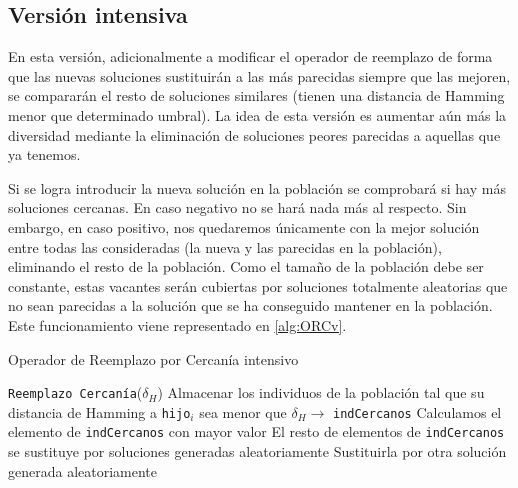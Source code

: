 \subsection{Versión intensiva}

En esta versión, adicionalmente a modificar el operador de reemplazo de forma que las nuevas soluciones sustituirán a las más parecidas siempre que las mejoren, se compararán el resto de soluciones similares (tienen una distancia de Hamming menor que determinado umbral). 
La idea de esta versión es aumentar aún más la diversidad mediante la eliminación de soluciones peores parecidas a aquellas que ya tenemos. 

Si se logra introducir la nueva solución en la población se comprobará si hay más soluciones cercanas. 
En caso negativo no se hará nada más al respecto. 
Sin embargo, en caso positivo, nos quedaremos únicamente con la mejor solución entre todas las consideradas (la nueva y las parecidas en la población), eliminando el resto de la población. 
Como el tamaño de la población debe ser constante, estas vacantes serán cubiertas por soluciones totalmente aleatorias que no sean parecidas a la solución que se ha conseguido mantener en la población. 
Este funcionamiento viene representado en \ref{alg:ORCv}.

\begin{algorithm}[H]
\caption{Operador de Reemplazo por Cercanía intensivo}\label{alg:ORCv}
\begin{algorithmic}[1]
\Procedure \texttt{Reemplazo Cercanía}($\delta_H$)
	\State Almacenar los individuos de la población tal que su distancia de Hamming a \texttt{hijo$_i$} sea menor que $\delta_H \xrightarrow{}{} $ \texttt{indCercanos}
	\State Calculamos el elemento de \texttt{indCercanos} con mayor valor
	\State El resto de elementos de \texttt{indCercanos} se sustituye por soluciones generadas aleatoriamente
		\State Sustituirla por otra solución generada aleatoriamente
	\EndWhile
\EndFor
\EndProcedure
\end{algorithmic}
\end{algorithm}